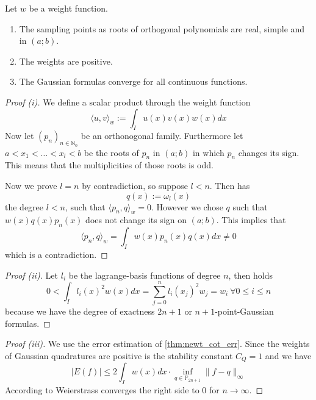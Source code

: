 \begin{proposition}
   Let \(w\) be a weight function.
   \begin{enumerate}[label=\roman*, align=Center]
      \item The sampling points as roots of orthogonal polynomials are real, simple and in \((a;b)\).
      \item The weights are positive.
      \item The Gaussian formulas converge for all continuous functions.
   \end{enumerate}
\end{proposition}
\begin{proof}[Proof (i)]
   We define a scalar product through the weight function
   \[\langle u, v \rangle_w := \int_I u(x) v(x) w(x) dx\]
   Now let \((p_n)_{n \in \mathbb{N}_0}\) be an orthonogonal family.
   Furthermore let \(a < x_1 < \ldots < x_l < b\) be the roots of \(p_n\) in \((a;b)\) in which \(p_n\) changes its sign.
   This means that the multiplicities of those roots is odd.

   Now we prove \(l = n\) by contradiction, so suppose \(l < n\).
   Then has
   \[q(x) := \omega_l(x)\]
   the degree \(l < n\), such that \(\langle p_n, q\rangle_w = 0\).
   However we chose \(q\) such that \(w(x) q(x) p_n(x)\) does not change its sign on \((a;b)\).
   This implies that
   \[\langle p_n, q\rangle_w = \int_I w(x) p_n(x) q(x) dx \neq 0\]
   which is a contradiction.
\end{proof}
\begin{proof}[Proof (ii)]
   Let \(l_i\) be the lagrange-basis functions of degree \(n\), then holds
   \[0 < \int_I l_i(x)^2 w(x)dx = \sum_{j=0}^n l_i(x_j)^2 w_j = w_i~\forall 0 \leq i \leq n\]
   because we have the degree of exactness \(2n + 1\) or \(n+1\)-point-Gaussian formulas.
\end{proof}
\begin{proof}[Proof (iii)]
   We use the error estimation of \cref{thm:newt_cot_err}.
   Since the weights of Gaussian quadratures are positive is the stability constant \(C_Q = 1\) and we have
   \[|E(f)| \leq 2 \int_I w(x) dx \cdot \inf_{q \in \mathbb{P}_{2n + 1}} \|f - q\|_\infty\]
   According to Weierstrass converges the right side to 0 for \(n \to \infty\).
\end{proof}


